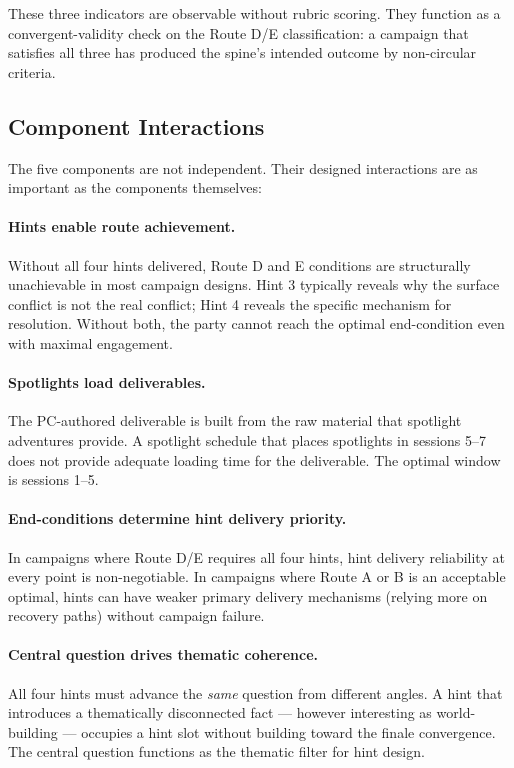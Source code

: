 These three indicators are observable without rubric scoring. They function as a
convergent-validity check on the Route D/E classification: a campaign that satisfies
all three has produced the spine's intended outcome by non-circular criteria.

\subsection{Component Interactions}

The five components are not independent. Their designed interactions are as
important as the components themselves:

\paragraph{Hints enable route achievement.}
Without all four hints delivered, Route D and E conditions are structurally
unachievable in most campaign designs. Hint 3 typically reveals why the surface
conflict is not the real conflict; Hint 4 reveals the specific mechanism for
resolution. Without both, the party cannot reach the optimal end-condition even
with maximal engagement.

\paragraph{Spotlights load deliverables.}
The PC-authored deliverable is built from the raw material that spotlight adventures
provide. A spotlight schedule that places spotlights in sessions 5--7 does not
provide adequate loading time for the deliverable. The optimal window is sessions 1--5.

\paragraph{End-conditions determine hint delivery priority.}
In campaigns where Route D/E requires all four hints, hint delivery reliability
at every point is non-negotiable. In campaigns where Route A or B is an acceptable
optimal, hints can have weaker primary delivery mechanisms (relying more on
recovery paths) without campaign failure.

\paragraph{Central question drives thematic coherence.}
All four hints must advance the \textit{same} question from different angles. A hint
that introduces a thematically disconnected fact --- however interesting as world-building
--- occupies a hint slot without building toward the finale convergence. The central
question functions as the thematic filter for hint design.

